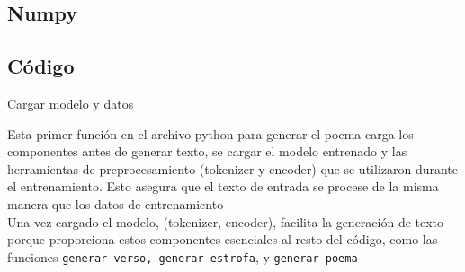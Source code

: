 \subsection{Numpy}


\subsection{Código}

\begin{center}
    Cargar modelo y datos
\end{center}

Esta primer función en el archivo python para generar el poema carga los componentes antes 
de generar texto, se cargar el modelo entrenado y las herramientas de preprocesamiento 
(tokenizer y encoder) que se utilizaron durante el entrenamiento. Esto asegura que el texto 
de entrada se procese de la misma manera que los datos de entrenamiento\\

Una vez cargado el modelo, (tokenizer, encoder), facilita la generación de texto porque proporciona 
estos componentes esenciales al resto del código, como las funciones \texttt{generar verso, generar 
estrofa}, y \texttt{generar poema}\\ 

